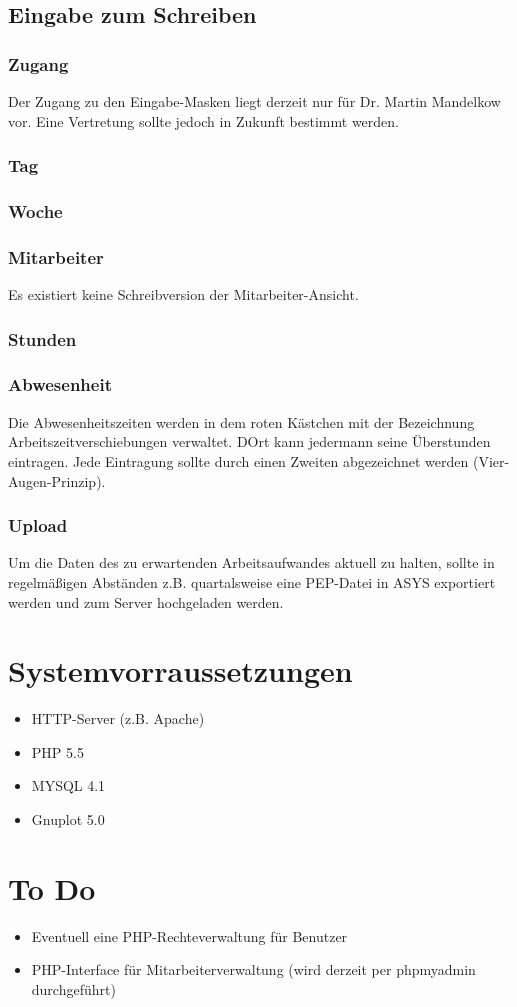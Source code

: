 \documentclass[10pt,a4paper,titlepage,oneside]{article}
\begin{document}
\subsection{Eingabe zum Schreiben}
\subsubsection{Zugang}
Der Zugang zu den Eingabe-Masken liegt derzeit nur für Dr. Martin Mandelkow vor. Eine Vertretung sollte jedoch in Zukunft bestimmt werden.

\subsubsection{Tag}
\subsubsection{Woche}
\subsubsection{Mitarbeiter}
Es existiert keine Schreibversion der Mitarbeiter-Ansicht.
\subsubsection{Stunden}
\subsubsection{Abwesenheit}
Die Abwesenheitszeiten werden in dem roten Kästchen mit der Bezeichnung Arbeitszeitverschiebungen verwaltet. DOrt kann jedermann seine Überstunden eintragen. Jede Eintragung sollte durch einen Zweiten abgezeichnet werden (Vier-Augen-Prinzip).
\subsubsection{Upload}
Um die Daten des zu erwartenden Arbeitsaufwandes aktuell zu halten, sollte in regelmäßigen Abständen z.B. quartalsweise eine PEP-Datei in ASYS exportiert werden und zum Server hochgeladen werden.



\section{Systemvorraussetzungen}
	\begin{itemize}
		\item HTTP-Server (z.B. Apache)
		\item PHP 5.5
		\item MYSQL 4.1
		\item Gnuplot 5.0
	\end{itemize}










\section{To Do}
\begin{itemize}
	\item Eventuell eine PHP-Rechteverwaltung für Benutzer
	\item PHP-Interface für Mitarbeiterverwaltung (wird derzeit per phpmyadmin durchgeführt)
\end{itemize}
\end{document}
